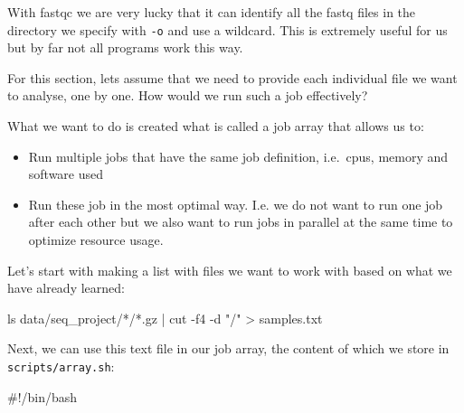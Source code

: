 \documentclass[
  letterpaper,
  DIV=11,
  numbers=noendperiod]{scrreprt}
\newenvironment{Shaded}{}{}
\newcommand{\AttributeTok}[1]{\textcolor[rgb]{0.84,0.23,0.29}{#1}}
\newcommand{\CommentTok}[1]{\textcolor[rgb]{0.42,0.45,0.49}{#1}}
\newcommand{\FunctionTok}[1]{\textcolor[rgb]{0.44,0.26,0.76}{#1}}
\newcommand{\KeywordTok}[1]{\textcolor[rgb]{0.84,0.23,0.29}{#1}}
\newcommand{\NormalTok}[1]{\textcolor[rgb]{0.14,0.16,0.18}{#1}}
\newcommand{\OperatorTok}[1]{\textcolor[rgb]{0.14,0.16,0.18}{#1}}
\newcommand{\PreprocessorTok}[1]{\textcolor[rgb]{0.84,0.23,0.29}{#1}}
\newcommand{\StringTok}[1]{\textcolor[rgb]{0.01,0.18,0.38}{#1}}
\providecommand{\tightlist}{%
  \setlength{\itemsep}{0pt}\setlength{\parskip}{0pt}}\usepackage{longtable,booktabs,array}
\begin{document}
\begin{tcolorbox}[enhanced jigsaw, coltitle=black, leftrule=.75mm, colback=white, toptitle=1mm, breakable, toprule=.15mm, colbacktitle=quarto-callout-tip-color!10!white, bottomtitle=1mm, arc=.35mm, opacitybacktitle=0.6, bottomrule=.15mm, titlerule=0mm, title=\textcolor{quarto-callout-tip-color}{\faLightbulb}\hspace{0.5em}{Advanced tip: sbatch and multiple files}, rightrule=.15mm, left=2mm, colframe=quarto-callout-tip-color-frame, opacityback=0]

With fastqc we are very lucky that it can identify all the fastq files
in the directory we specify with \texttt{-o} and use a wildcard. This is
extremely useful for us but by far not all programs work this way.

For this section, lets assume that we need to provide each individual
file we want to analyse, one by one. How would we run such a job
effectively?

What we want to do is created what is called a job array that allows us
to:

\begin{itemize}
\tightlist
\item
  Run multiple jobs that have the same job definition, i.e.~cpus, memory
  and software used
\item
  Run these job in the most optimal way. I.e. we do not want to run one
  job after each other but we also want to run jobs in parallel at the
  same time to optimize resource usage.
\end{itemize}

Let's start with making a list with files we want to work with based on
what we have already learned:

\begin{Shaded}
\begin{Highlighting}[]
\FunctionTok{ls}\NormalTok{ data/seq\_project/}\PreprocessorTok{*}\NormalTok{/}\PreprocessorTok{*}\NormalTok{.gz }\KeywordTok{|} \FunctionTok{cut} \AttributeTok{{-}f4} \AttributeTok{{-}d} \StringTok{"/"} \OperatorTok{\textgreater{}}\NormalTok{ samples.txt}
\end{Highlighting}
\end{Shaded}

Next, we can use this text file in our job array, the content of which
we store in \texttt{scripts/array.sh}:

\begin{Shaded}
\begin{Highlighting}[]
\CommentTok{\#!/bin/bash}


\end{Highlighting}
\end{Shaded}
\end{tcolorbox}
\end{document}
